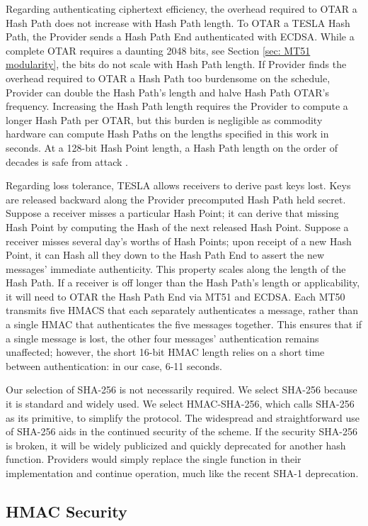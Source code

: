 \documentclass[letterpaper,times]{IONconf/IONconf}
\begin{document}
Regarding authenticating ciphertext efficiency, the overhead required to OTAR a Hash Path does not increase with Hash Path length.
To OTAR a TESLA Hash Path, the Provider sends a Hash Path End authenticated with ECDSA.
While a complete OTAR requires a daunting 2048 bits, see Section \ref{sec: MT51 modularity}, the bits do not scale with Hash Path length.
If Provider finds the overhead required to OTAR a Hash Path too burdensome on the schedule, Provider can double the Hash Path's length and halve Hash Path OTAR's frequency.
Increasing the Hash Path length requires the Provider to compute a longer Hash Path per OTAR, but this burden is negligible as commodity hardware can compute Hash Paths on the lengths specified in this work in seconds.
At a 128-bit Hash Point length, a Hash Path length on the order of decades is safe from attack \cite{Neish_Dissertation}.

Regarding loss tolerance, TESLA allows receivers to derive past keys lost.
Keys are released backward along the Provider precomputed Hash Path held secret.
Suppose a receiver misses a particular Hash Point; it can derive that missing Hash Point by computing the Hash of the next released Hash Point.
Suppose a receiver misses several day's worths of Hash Points; upon receipt of a new Hash Point, it can Hash all they down to the Hash Path End to assert the new messages' immediate authenticity.
This property scales along the length of the Hash Path.
If a receiver is off longer than the Hash Path's length or applicability, it will need to OTAR the Hash Path End via MT51 and ECDSA.
Each MT50 transmits five HMACS that each separately authenticates a message, rather than a single HMAC that authenticates the five messages together.
This ensures that if a single message is lost, the other four messages' authentication remains unaffected; however, the short 16-bit HMAC length relies on a short time between authentication: in our case, 6-11 seconds.

Our selection of SHA-256 is not necessarily required.
We select SHA-256 because it is standard and widely used.
We select HMAC-SHA-256, which calls SHA-256 as its primitive, to simplify the protocol.
The widespread and straightforward use of SHA-256 aids in the continued security of the scheme.
If the security SHA-256 is broken, it will be widely publicized and quickly deprecated for another hash function.
Providers would simply replace the single function in their implementation and continue operation, much like the recent SHA-1 deprecation.

\subsection{HMAC Security} \label{sec: HMAC security}
\end{document}
